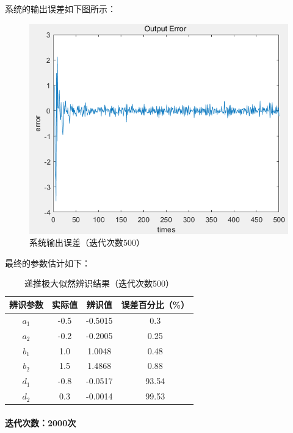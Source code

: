 \documentclass[UTF8]{article}
\begin{document}
系统的输出误差如下图所示：
\begin{figure}[H]
    \centering %
    \includegraphics[width=.8\textwidth]{figure/递推极大似然-系统输出误差.png} 
    \caption{系统输出误差（迭代次数500）} %
\end{figure}

最终的参数估计如下：
\begin{table}[H] %
\centering %
\begin{tabular}{cccc} %
    \toprule %
    辨识参数 & 实际值 & 辨识值 & 误差百分比（\%） \\
    \midrule %
    $a_1$ & -0.5 & -0.5015 & 0.3 \\
    $a_2$ & -0.2 & -0.2005 & 0.25 \\
    $b_1$ & 1.0 & 1.0048 & 0.48 \\
    $b_2$ & 1.5 & 1.4868 & 0.88 \\
    $d_1$ & -0.8 & -0.0517 & 93.54 \\ 
    $d_2$ & 0.3 & -0.0014 & 99.53 \\
    \bottomrule %
\end{tabular}
\caption{递推极大似然辨识结果（迭代次数500）} %
\end{table}


\paragraph{迭代次数：2000次}~{}
\end{document}

